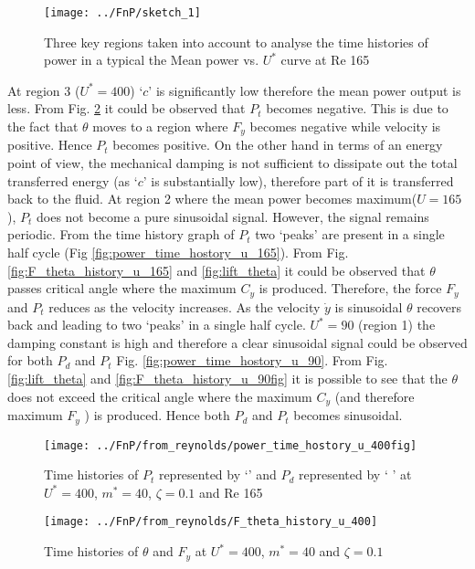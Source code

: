 \begin{figure}[h!]
\centering
\texttt{[image: ../FnP/sketch\_1]}
\caption{ Three key regions taken into account to analyse the time histories of power in a typical the Mean power vs. $U^*$ curve at Re 165 }
\label{fig:regions_1}
\end{figure}


At region 3 ($U^*= 400$) `$c$' is significantly low therefore the mean power output is less. From Fig. \ref{fig:power_time_hostory_u_400fig} it could be observed that $P_t$ becomes negative. This is due to the fact that $\theta$ moves to a region where $F_y$ becomes negative while velocity is positive. Hence $P_t$ becomes positive. On the other hand in terms of an energy point  of view, the mechanical damping is not sufficient to dissipate out the total transferred energy (as `$c$' is substantially low), therefore  part of it  is transferred back to the fluid. At region 2 where the  mean power becomes maximum($U=165$), $P_t$ does not become a pure sinusoidal signal. However, the  signal remains periodic. From the time history graph of $P_t$ two `peaks' are present in a single half cycle (Fig \ref{fig:power_time_hostory_u_165}). From  Fig. \ref{fig:F_theta_history_u_165} and \ref{fig:lift_theta} it could be observed that $\theta$ passes critical angle where the maximum $C_y$ is produced. Therefore, the force $F_y$ and $P_t$ reduces as the velocity increases. As the velocity $\dot{y}$ is sinusoidal $\theta$ recovers back and leading to two `peaks'  in a single half cycle.  $U^*=90$ (region 1) the damping constant is high and therefore a clear sinusoidal signal could be observed for both $P_d$ and $P_t$ Fig. \ref{fig:power_time_hostory_u_90}. From Fig. \ref{fig:lift_theta} and  \ref{fig:F_theta_history_u_90fig}  it is possible to see that the $\theta$  does not exceed the critical angle where the maximum $C_y$ (and therefore maximum $F_y$ ) is produced. Hence both $P_d$ and $P_t$ becomes sinusoidal.
  

 \begin{figure}
 \centering
 \texttt{[image: ../FnP/from\_reynolds/power\_time\_hostory\_u\_400fig]}
 \caption{Time histories of  $P_t$  represented by `\protect\dashedrule' and $P_d$ represented by ` \solidrule[4mm]\hspace{1mm}' at $U^*=400$, $m^*=40$, $\zeta=0.1$ and Re 165 }  
 \label{fig:power_time_hostory_u_400fig}
 \end{figure}
 
 \begin{figure}
 \centering
 \texttt{[image: ../FnP/from\_reynolds/F\_theta\_history\_u\_400]}
 \caption{Time histories of $\theta$ and $F_y$ at $U^*=400$, $m^*=40$ and $\zeta=0.1$}
 \label{fig:F_theta_history_u_400}
 \end{figure}
 
